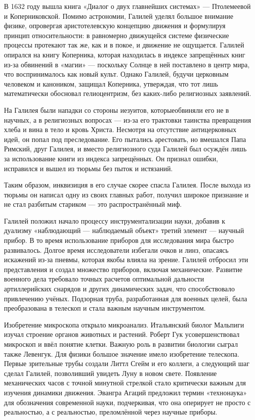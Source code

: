 В 1632 году вышла книга «Диалог о двух главнейших системах» --- Птолемеевой и Коперниковской. Помимо астрономии, Галилей уделял большое внимание физике, опровергая аристотелевскую концепцию движения и формулируя принцип относительности: в равномерно движущейся системе физические процессы протекают так же, как и в покое, и движение не ощущается.
Галилей опирался на книгу Коперника, которая находилась в индексе запрещённых книг из-за обвинений в «магии» --- поскольку Солнце в ней поставлено в центр мира, что воспринималось как новый культ. Однако Галилей, будучи церковным человеком и каноником, защищал Коперника, утверждая, что тот лишь математически обосновал гелиоцентризм, без каких-либо религиозных заявлений.

На Галилея были нападки со стороны иезуитов, которыеобвиняли его не в научных, а в религиозных вопросах --- из-за его трактовки таинства превращения хлеба и вина в тело и кровь Христа. Несмотря на отсутствие антицерковных идей, он попал под преследование. Его пытались арестовать, но вмешался Папа Римский, друг Галилея, и вместо религиозного суда Галилей был осуждён лишь за использование книги из индекса запрещённых. Он признал ошибки, исправился и вышел из тюрьмы без пыток и истязаний.

Таким образом, инквизиция в его случае скорее спасла Галилея. После выхода из тюрьмы он написал одну из своих главных работ, получил широкое признание и не стал разбитым стариком --- это распространённый миф.

Галилей положил начало процессу инструментализации науки, добавив к дуализму «наблюдающий --- наблюдаемый объект» третий элемент --- научный прибор.
В то время использование приборов для исследования мира быстро развивалось. Долгое время исследователи избегали очков и линз, опасаясь искажений из-за пневмы, которая якобы влияла на зрение. Галилей отбросил эти представления и создал множество приборов, включая механические.
Развитие военного дела требовало точных расчетов оптимальной дальности артиллерийских снарядов и других динамических задач, что способствовало привлечению учёных. Подзорная труба, разработанная для военных целей, была преобразована в телескоп и стала важным научным инструментом.

Изобретение микроскопа открыло микроанализ. Итальянский биолог Мальпиги изучал строение органов животных и растений. Роберт Гук усовершенствовал микроскоп и ввёл понятие клетки. Важную роль в развитии биологии сыграл также Левенгук.
Для физики большое значение имело изобретение телескопа. Первые зрительные трубы создали Литтл Сгейм и его коллеги, а следующий шаг сделал Галилей, позволивший увидеть Луну в новом свете.
Появление механических часов с точной минутной стрелкой стало критически важным для изучения динамики движения.
Эвангра Агаций предложил термин «технонаука» для обозначения современной науки, подчеркивая, что она оперирует не просто с реальностью, а с реальностью, преломлённой через научные приборы.

